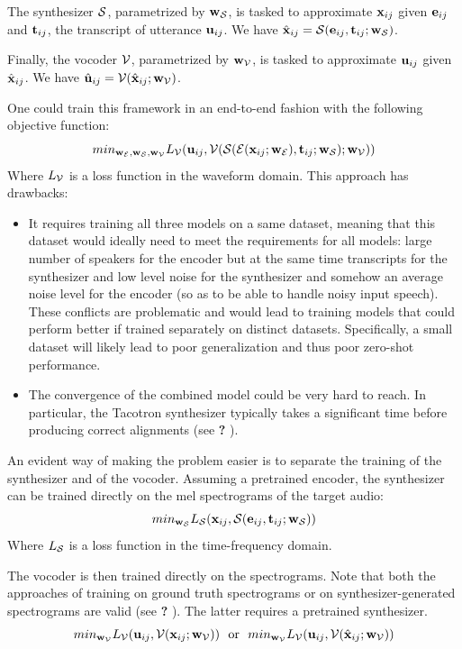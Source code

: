 \documentclass[a4paper, oneside, 12pt, english]{article}
\newcommand{\rw}{\color{red}\textbf{?} \color{black}}		%
\begin{document}
The synthesizer $\mathcal{S}$, parametrized by $\mathbf{w}_{\mathcal{S}}$, is tasked to approximate $\mathbf{x}_{ij}$ given $\mathbf{e}_{ij}$ and $\mathbf{t}_{ij}$, the transcript of utterance $\mathbf{u}_{ij}$. We have $\hat{\mathbf{x}}_{ij} = \mathcal{S}(\mathbf{e}_{ij}, \mathbf{t}_{ij}; \mathbf{w}_{\mathcal{S}})$.

Finally, the vocoder $\mathcal{V}$, parametrized by $\mathbf{w}_{\mathcal{V}}$, is tasked to approximate $\mathbf{u}_{ij}$ given $\hat{\mathbf{x}}_{ij}$. We have $\hat{\mathbf{u}}_{ij} = \mathcal{V}(\hat{\mathbf{x}}_{ij}; \mathbf{w}_{\mathcal{V}})$.

One could train this framework in an end-to-end fashion with the following objective function:
$$ min_{\mathbf{w}_{\mathcal{E}}, \mathbf{w}_{\mathcal{S}}, \mathbf{w}_{\mathcal{V}}} L_{\mathcal{V}}(\mathbf{u}_{ij}, \mathcal{V}(\mathcal{S}(\mathcal{E}(\mathbf{x}_{ij}; \mathbf{w}_{\mathcal{E}}), \mathbf{t}_{ij}; \mathbf{w}_{\mathcal{S}}); \mathbf{w}_{\mathcal{V}})) $$
Where $L_{\mathcal{V}}$ is a loss function in the waveform domain. This approach has drawbacks:
\begin{itemize}
	\item It requires training all three models on a same dataset, meaning that this dataset would ideally need to meet the requirements for all models: large number of speakers for the encoder but at the same time transcripts for the synthesizer and low level noise for the synthesizer and somehow an average noise level for the encoder (so as to be able to handle noisy input speech). These conflicts are problematic and would lead to training models that could perform better if trained separately on distinct datasets. Specifically, a small dataset will likely lead to poor generalization and thus poor zero-shot performance.
	\item The convergence of the combined model could be very hard to reach. In particular, the Tacotron synthesizer typically takes a significant time before producing correct alignments (see \rw).
\end{itemize}

An evident way of making the problem easier is to separate the training of the synthesizer and of the vocoder. Assuming a pretrained encoder, the synthesizer can be trained directly on the mel spectrograms of the target audio:
$$ min_{\mathbf{w}_{\mathcal{S}}} L_{\mathcal{S}}(\mathbf{x}_{ij}, \mathcal{S}(\mathbf{e}_{ij}, \mathbf{t}_{ij}; \mathbf{w}_{\mathcal{S}})) $$
Where $L_{\mathcal{S}}$ is a loss function in the time-frequency domain. 

The vocoder is then trained directly on the spectrograms. Note that both the approaches of training on ground truth spectrograms or on synthesizer-generated spectrograms are valid (see \rw). The latter requires a pretrained synthesizer.
$$ min_{\vw_\voc} L_\voc(\vu_{ij}, \voc(\vx_{ij}; \vw_\voc)) \ \ \text{or} \ \ 
   min_{\vw_\voc} L_\voc(\vu_{ij}, \voc(\hat\vx_{ij}; \vw_\voc))$$
\end{document}
